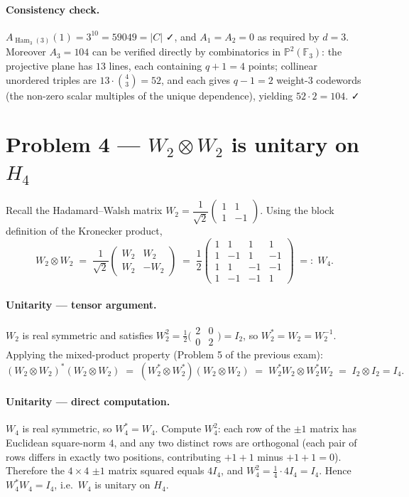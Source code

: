 \documentclass[11pt,a4paper]{article}
\newcommand{\F}{\mathbb{F}}
\newcommand{\PP}{\mathbb{P}}
\newcommand{\Ham}{\operatorname{Ham}}
\begin{document}
\paragraph{Consistency check.}
$A_{\Ham_3(3)}(1)=3^{10}=59049=|C|$ ✓, and $A_1=A_2=0$ as required by $d=3$. Moreover $A_3=104$ can be verified directly by combinatorics in $\PP^{2}(\F_3)$: the projective plane has $13$ lines, each containing $q+1=4$ points; collinear unordered triples are $13\cdot\binom{4}{3}=52$, and each gives $q-1=2$ weight-$3$ codewords (the non-zero scalar multiples of the unique dependence), yielding $52\cdot 2=104$. ✓

\section*{Problem 4 --- $W_2\otimes W_2$ is unitary on $H_4$}

Recall the Hadamard--Walsh matrix
\(
W_2=\dfrac{1}{\sqrt 2}\begin{pmatrix}1 & 1\\1 & -1\end{pmatrix}.
\)
Using the block definition of the Kronecker product,
\[
W_2\otimes W_2
\;=\;\frac{1}{\sqrt 2}\begin{pmatrix}W_2 & W_2\\ W_2 & -W_2\end{pmatrix}
\;=\;\frac{1}{2}
\begin{pmatrix}
1 & 1 & 1 & 1\\
1 & -1 & 1 & -1\\
1 & 1 & -1 & -1\\
1 & -1 & -1 & 1
\end{pmatrix} \;=:\; W_4 .
\]

\paragraph{Unitarity --- tensor argument.}
$W_2$ is real symmetric and satisfies $W_2^{2}=\tfrac12\bigl(\begin{smallmatrix}2&0\\0&2\end{smallmatrix}\bigr)=I_2$, so $W_2^{*}=W_2=W_2^{-1}$. Applying the mixed-product property (Problem 5 of the previous exam):
\[
(W_2\otimes W_2)^{*}(W_2\otimes W_2)
\;=\;(W_2^{*}\otimes W_2^{*})(W_2\otimes W_2)
\;=\;W_2^{*}W_2\otimes W_2^{*}W_2
\;=\;I_2\otimes I_2 = I_4 .
\]

\paragraph{Unitarity --- direct computation.}
$W_4$ is real symmetric, so $W_4^{*}=W_4$. Compute $W_4^{2}$: each row of the $\pm1$ matrix has Euclidean square-norm $4$, and any two distinct rows are orthogonal (each pair of rows differs in exactly two positions, contributing $+1+1$ minus $+1+1=0$). Therefore the $4\times 4$ $\pm1$ matrix squared equals $4 I_4$, and $W_4^{2}=\frac{1}{4}\cdot 4 I_4 = I_4$. Hence $W_4^{*}W_4=I_4$, i.e.\ $W_4$ is unitary on $H_4$.
\end{document}
